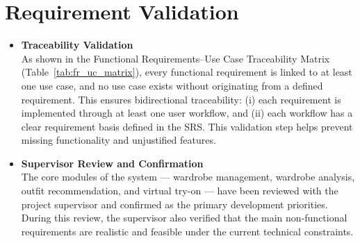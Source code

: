 \section{Requirement Validation}
\begin{itemize}
    \item \textbf{Traceability Validation}\\
As shown in the Functional Requirements--Use Case Traceability Matrix
(Table~\ref{tab:fr_uc_matrix}), every functional requirement is linked to at least
one use case, and no use case exists without originating from a defined
requirement. This ensures bidirectional traceability: (i) each requirement is
implemented through at least one user workflow, and (ii) each workflow has a
clear requirement basis defined in the SRS. This validation step helps prevent
missing functionality and unjustified features.

    \item \textbf{Supervisor Review and Confirmation}\\
    The core modules of the system --- wardrobe management, wardrobe analysis, outfit recommendation, and virtual try-on --- have been reviewed with the project supervisor and confirmed as the primary development priorities. During this review, the supervisor also verified that the main non-functional requirements are realistic and feasible under the current technical constraints.
    
\end{itemize}